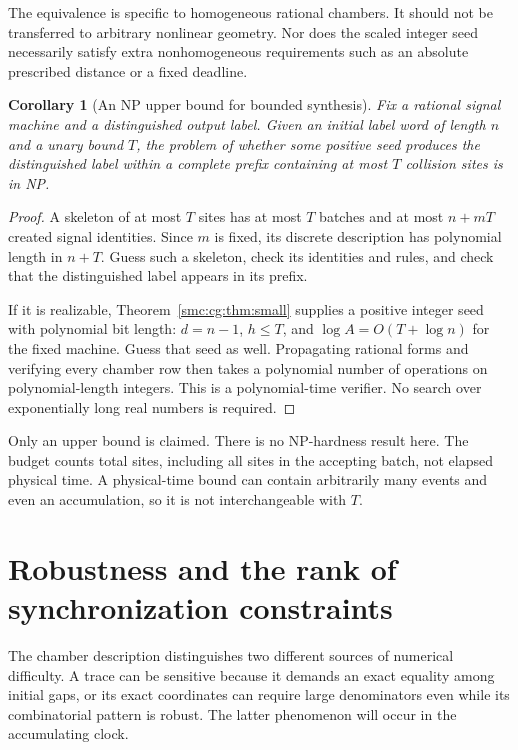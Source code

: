 \documentclass[11pt,letterpaper]{article}
\numberwithin{equation}{section}
\newtheorem{corollary}[theorem]{Corollary}
\theoremstyle{definition}
\theoremstyle{remark}
\begin{document}
The equivalence is specific to homogeneous rational chambers. It should not
be transferred to arbitrary nonlinear geometry. Nor does the scaled integer
seed necessarily satisfy extra nonhomogeneous requirements such as an
absolute prescribed distance or a fixed deadline.

\begin{corollary}[An NP upper bound for bounded synthesis]
\label{smc:cg:cor:NP}
Fix a rational signal machine and a distinguished output label. Given an
initial label word of length $n$ and a unary bound $T$, the problem of whether
some positive seed produces the distinguished label within a complete prefix
containing at most $T$ collision sites is in NP.
\end{corollary}
\begin{proof}
A skeleton of at most $T$ sites has at most $T$ batches and at most $n+mT$
created signal identities. Since $m$ is fixed, its discrete description has
polynomial length in $n+T$. Guess such a skeleton, check its identities and
rules, and check that the distinguished label appears in its prefix.

If it is realizable, Theorem~\ref{smc:cg:thm:small} supplies a positive integer seed
with polynomial bit length: $d=n-1$, $h\le T$, and
$\log A=O(T+\log n)$ for the fixed machine. Guess that seed as well.
Propagating rational forms and verifying every chamber row then takes a
polynomial number of operations on polynomial-length integers. This is a
polynomial-time verifier. No search over exponentially long real numbers is
required.
\end{proof}

Only an upper bound is claimed. There is no NP-hardness result here. The
budget counts total sites, including all sites in the accepting batch, not
elapsed physical time. A physical-time bound can contain arbitrarily many
events and even an accumulation, so it is not interchangeable with $T$.

\section{Robustness and the rank of synchronization constraints}
\label{smc:cg:sec:robust}

The chamber description distinguishes two different sources of numerical
difficulty. A trace can be sensitive because it demands an exact equality
among initial gaps, or its exact coordinates can require large denominators
even while its combinatorial pattern is robust. The latter phenomenon will
occur in the accumulating clock.
\end{document}
